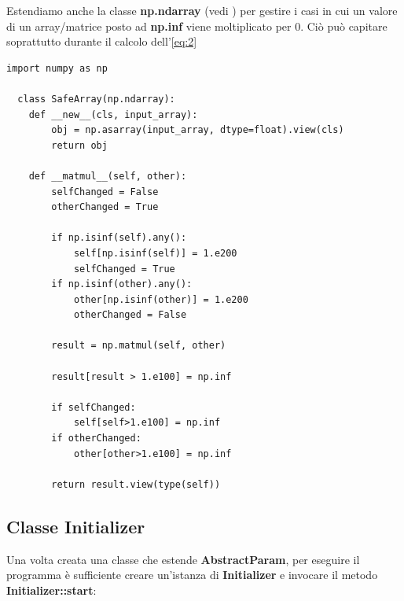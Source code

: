 Estendiamo anche la classe \textbf{np.ndarray} (vedi \cite{numpy_docs}) per gestire i casi in cui un valore di un array/matrice posto ad \textbf{np.inf} viene moltiplicato per 0.
Ciò può capitare soprattutto durante il calcolo dell'\autoref{eq:2}

\begin{lstlisting}[style=myStile, caption={SafeArray}, label={script:3}]
  import numpy as np

  class SafeArray(np.ndarray):
    def __new__(cls, input_array):
        obj = np.asarray(input_array, dtype=float).view(cls)
        return obj
    
    def __matmul__(self, other):
        selfChanged = False
        otherChanged = True        
        
        if np.isinf(self).any():
            self[np.isinf(self)] = 1.e200
            selfChanged = True
        if np.isinf(other).any():
            other[np.isinf(other)] = 1.e200
            otherChanged = False
            
        result = np.matmul(self, other)
        
        result[result > 1.e100] = np.inf
        
        if selfChanged:
            self[self>1.e100] = np.inf
        if otherChanged:
            other[other>1.e100] = np.inf

        return result.view(type(self))
\end{lstlisting}


\subsection{Classe Initializer}
\label{subsec:Initializer}

Una volta creata una classe che estende \textbf{AbstractParam}, per eseguire il programma è sufficiente creare un'istanza di \textbf{Initializer} e invocare il metodo 
\textbf{Initializer::start}:

